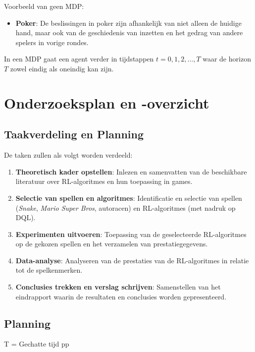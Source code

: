 \documentclass[a4paper,12pt]{article}
\begin{document}
Voorbeeld van geen MDP:
\begin{itemize}
    \item \textbf{Poker}: De beslissingen in poker zijn afhankelijk van niet alleen de huidige hand, maar ook van de geschiedenis van inzetten en het gedrag van andere spelers in vorige rondes.
\end{itemize}

In een MDP gaat een agent verder in tijdstappen \(t = 0, 1, 2, \ldots, T\) waar
de horizon \(T\) zowel eindig als oneindig kan zijn.

\section{Onderzoeksplan en -overzicht}

\subsection{Taakverdeling en Planning}
De taken zullen als volgt worden verdeeld:
\begin{enumerate}
    \item \textbf{Theoretisch kader opstellen}: Inlezen en samenvatten van de beschikbare literatuur over RL-algoritmes en hun toepassing in games.
    \item \textbf{Selectie van spellen en algoritmes}: Identificatie en selectie van spellen (\textit{Snake}, \textit{Mario Super Bros}, autoracen) en RL-algoritmes (met nadruk op DQL).
    \item \textbf{Experimenten uitvoeren}: Toepassing van de geselecteerde RL-algoritmes op de gekozen spellen en het verzamelen van prestatiegegevens.
    \item \textbf{Data-analyse}: Analyseren van de prestaties van de RL-algoritmes in relatie tot de spelkenmerken.
    \item \textbf{Conclusies trekken en verslag schrijven}: Samenstellen van het eindrapport waarin de resultaten en conclusies worden gepresenteerd.
\end{enumerate}

\subsection{Planning}
T = Gechatte tijd pp \\ \small
\end{document}
